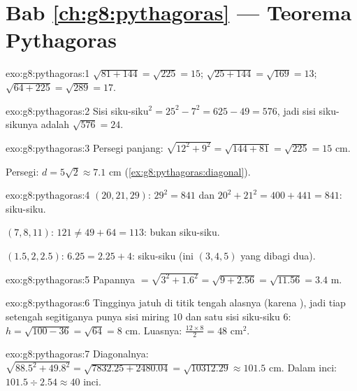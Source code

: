 \section*{Bab \ref{ch:g8:pythagoras} --- Teorema Pythagoras}

\begin{solution}{exo:g8:pythagoras:1}
$\sqrt{81 + 144} = \sqrt{225} = 15$; \quad
$\sqrt{25 + 144} = \sqrt{169} = 13$; \quad
$\sqrt{64 + 225} = \sqrt{289} = 17$.
\end{solution}

\begin{solution}{exo:g8:pythagoras:2}
Sisi siku-siku$^2 = 25^2 - 7^2 = 625 - 49 = 576$, jadi sisi
siku-sikunya adalah $\sqrt{576} = 24$.
\end{solution}

\begin{solution}{exo:g8:pythagoras:3}
Persegi panjang: $\sqrt{12^2 + 9^2} = \sqrt{144 + 81} = \sqrt{225} =
15$ cm.

Persegi: $d = 5\sqrt2 \approx 7.1$ cm
(\cref{ex:g8:pythagoras:diagonal}).
\end{solution}

\begin{solution}{exo:g8:pythagoras:4}
$(20, 21, 29)$: $29^2 = 841$ dan $20^2 + 21^2 = 400 + 441 = 841$:
siku-siku.

$(7, 8, 11)$: $121 \neq 49 + 64 = 113$: bukan siku-siku.

$(1.5, 2, 2.5)$: $6.25 = 2.25 + 4$: siku-siku (ini
$(3,4,5)$ yang dibagi dua).
\end{solution}

\begin{solution}{exo:g8:pythagoras:5}
Papannya $= \sqrt{3^2 + 1.6^2} = \sqrt{9 + 2.56} = \sqrt{11.56} = 3.4$
m.
\end{solution}

\begin{solution}{exo:g8:pythagoras:6}
Tingginya jatuh di titik tengah alasnya (karena ),
jadi tiap setengah segitiganya punya sisi miring $10$ dan satu sisi
siku-siku $6$: $h = \sqrt{100 - 36} = \sqrt{64} = 8$ cm. Luasnya:
$\frac{12 \times 8}{2} = 48$ cm$^2$.
\end{solution}

\begin{solution}{exo:g8:pythagoras:7}
Diagonalnya: $\sqrt{88.5^2 + 49.8^2} = \sqrt{7832.25 + 2480.04}
= \sqrt{10312.29} \approx 101.5$ cm. Dalam inci:
$101.5 \div 2.54 \approx 40$ inci.
\end{solution}

